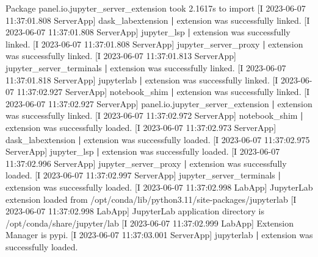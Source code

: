 \documentclass[
]{book}
\newenvironment{Shaded}{\begin{snugshade}}{\end{snugshade}}
\newcommand{\ExtensionTok}[1]{#1}
\newcommand{\KeywordTok}[1]{\textcolor[rgb]{0.13,0.29,0.53}{\textbf{#1}}}
\newcommand{\NormalTok}[1]{#1}
\newcommand{\StringTok}[1]{\textcolor[rgb]{0.31,0.60,0.02}{#1}}
\begin{document}
\begin{Shaded}
\begin{Highlighting}[]
\ExtensionTok{[I}\NormalTok{ 2023{-}06{-}07 11:37:01.808 ServerApp] Package panel.io.jupyter\_server\_extension took 2.1617s to import}
\ExtensionTok{[I}\NormalTok{ 2023{-}06{-}07 11:37:01.808 ServerApp] dask\_labextension }\KeywordTok{|} \ExtensionTok{extension}\NormalTok{ was successfully linked.}
\ExtensionTok{[I}\NormalTok{ 2023{-}06{-}07 11:37:01.808 ServerApp] jupyter\_lsp }\KeywordTok{|} \ExtensionTok{extension}\NormalTok{ was successfully linked.}
\ExtensionTok{[I}\NormalTok{ 2023{-}06{-}07 11:37:01.808 ServerApp] jupyter\_server\_proxy }\KeywordTok{|} \ExtensionTok{extension}\NormalTok{ was successfully linked.}
\ExtensionTok{[I}\NormalTok{ 2023{-}06{-}07 11:37:01.813 ServerApp] jupyter\_server\_terminals }\KeywordTok{|} \ExtensionTok{extension}\NormalTok{ was successfully linked.}
\ExtensionTok{[I}\NormalTok{ 2023{-}06{-}07 11:37:01.818 ServerApp] jupyterlab }\KeywordTok{|} \ExtensionTok{extension}\NormalTok{ was successfully linked.}
\ExtensionTok{[I}\NormalTok{ 2023{-}06{-}07 11:37:02.927 ServerApp] notebook\_shim }\KeywordTok{|} \ExtensionTok{extension}\NormalTok{ was successfully linked.}
\ExtensionTok{[I}\NormalTok{ 2023{-}06{-}07 11:37:02.927 ServerApp] panel.io.jupyter\_server\_extension }\KeywordTok{|} \ExtensionTok{extension}\NormalTok{ was successfully linked.}
\ExtensionTok{[I}\NormalTok{ 2023{-}06{-}07 11:37:02.972 ServerApp] notebook\_shim }\KeywordTok{|} \ExtensionTok{extension}\NormalTok{ was successfully loaded.}
\ExtensionTok{[I}\NormalTok{ 2023{-}06{-}07 11:37:02.973 ServerApp] dask\_labextension }\KeywordTok{|} \ExtensionTok{extension}\NormalTok{ was successfully loaded.}
\ExtensionTok{[I}\NormalTok{ 2023{-}06{-}07 11:37:02.975 ServerApp] jupyter\_lsp }\KeywordTok{|} \ExtensionTok{extension}\NormalTok{ was successfully loaded.}
\ExtensionTok{[I}\NormalTok{ 2023{-}06{-}07 11:37:02.996 ServerApp] jupyter\_server\_proxy }\KeywordTok{|} \ExtensionTok{extension}\NormalTok{ was successfully loaded.}
\ExtensionTok{[I}\NormalTok{ 2023{-}06{-}07 11:37:02.997 ServerApp] jupyter\_server\_terminals }\KeywordTok{|} \ExtensionTok{extension}\NormalTok{ was successfully loaded.}
\ExtensionTok{[I}\NormalTok{ 2023{-}06{-}07 11:37:02.998 LabApp] JupyterLab extension loaded from /opt/conda/lib/python3.11/site{-}packages/jupyterlab}
\ExtensionTok{[I}\NormalTok{ 2023{-}06{-}07 11:37:02.998 LabApp] JupyterLab application directory is /opt/conda/share/jupyter/lab}
\ExtensionTok{[I}\NormalTok{ 2023{-}06{-}07 11:37:02.999 LabApp] Extension Manager is }\StringTok{\textquotesingle{}pypi\textquotesingle{}}\NormalTok{.}
\ExtensionTok{[I}\NormalTok{ 2023{-}06{-}07 11:37:03.001 ServerApp] jupyterlab }\KeywordTok{|} \ExtensionTok{extension}\NormalTok{ was successfully loaded.}

\end{Highlighting}
\end{Shaded}
\end{document}
